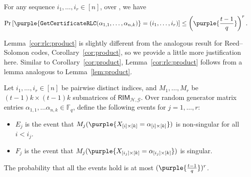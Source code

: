 \documentclass{article}[11pt]
\begin{document}
\begin{lemma}
  For any sequence $i_1,\dots,i_{r}\in[n]$, over , we have
  \begin{align}
    \Pr\left[\purple{\mathtt{GetCertificateRLC}(\alpha_{1,1},\dots,\alpha_{n,k})} = (i_1,\dots,i_{r})\right] 
    \le \left(\purple{\frac{t-1}{q}}\right)^{r}.
    \label{}
  \end{align}
   \label{cor:rlc:product}
\end{lemma}
Lemma~\ref{cor:rlc:product} is slightly different from the analogous result for Reed--Solomon codes, Corollary~\ref{cor:product}, so we provide a little more justification here.
Similar to Corollary~\ref{cor:product}, Lemma~\ref{cor:rlc:product} follows from a lemma analogous to Lemma~\ref{lem:product}.
\begin{lemma}
  Let $i_1,\dots,i_{r}\in[n]$ be pairwise distinct indices, and $M_1,\dots,M_r$ be $(t-1)k\times (t-1)k$ submatrices of $\mathsf{RIM}_{\mathcal{H},\mathcal{G}}$. Over random generator matrix entries $\alpha_{1,1},\dots\alpha_{n,k} \in \mathbb{F}_q$, define the following events for $j=1,\dots,r$:
\begin{itemize}
  \item $E_j$ is the event that $M_j(\purple{X_{[i]\times [k]}=\alpha_{[i]\times [k]}})$ is non-singular for all $i < i_j$.
  \item $F_j$ is the event that $M_j(\purple{X_{[i_j]\times [k]}=\alpha_{[i_j]\times [k]}})$ is singular.
  \end{itemize}
  The probability that all the events hold is at most $(\purple{\frac{t-1}{q}})^{r}$.
  \label{lem:rlc:product}
\end{lemma}
\end{document}
